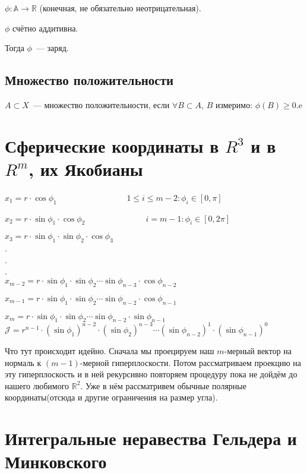 \documentclass[paper=a4, fontsize=17pt]{article}
\begin{document}
$\phi: \mathds{A} \to \mathds{R}$ (конечная, не обязательно неотрицательная).

$\phi$ счётно аддитивна.

Тогда $\phi$~--- заряд.

\subsection{Множество положительности}
$A \subset X$~--- множество положительности, если
$\forall B \subset A$, $B$ измеримо: $\phi(B) \geq 0$.e

\section{Сферические координаты в $ R^3 $ и в $ R^m $, их Якобианы}
$x_1 = r \cdot \cos \phi_1$
$\ \ \ \ \ \ \ \ \ \ \ \ \ \ \ \ \ \ \ \ \ \ \ \ \ \ \ \ \ \ \ \ \ \ \ $ 
$1 \leq i \leq m-2: \phi_i \in [0,\pi]$

$x_2 = r \cdot \sin \phi_1 \cdot \cos \phi_2$
$\ \ \ \ \ \ \ \ \ \ \ \ \ \ \ \ \ \ \ \ \ \ \ \ \ \ \ \ \ \ $
$i=m-1: \phi_i \in [0,2\pi]$

$x_3 = r \cdot \sin \phi_1 \cdot \sin \phi_2 \cdot \cos \phi_3$\\
.\\
.\\
.\\
$x_{m-2} = r \cdot \sin \phi_1 \cdot \sin \phi_2 \cdots \sin \phi_{n-3} \cdot \cos \phi_{n-2}$

$x_{m-1} = r \cdot \sin \phi_1 \cdot \sin \phi_2 \cdots \sin \phi_{n-2} \cdot \cos \phi_{n-1}$


$x_{m} = r \cdot \sin \phi_1 \cdot \sin \phi_2 \cdots \sin \phi_{n-2} \cdot \sin \phi_{n-1}$\\

$\mathcal{J} = r^{n-1} \cdot (\sin \phi_1)^{n-2} \cdot (\sin \phi_2)^{n-3} \cdots (\sin \phi_{n-2})^{1} \cdot (\sin \phi_{n-1})^{0}$

Что тут происходит идейно. Сначала мы проецируем наш $m$-мерный вектор на нормаль к $(m-1)$-мерной гиперплоскости. Потом рассматриваем проекцию на эту гиперплоскость и в ней рекурсивно повторяем процедуру пока не дойдём до нашего любимого $\mathbb{R}^2$. Уже в нём рассматривем обычные полярные координаты(отсюда и другие ограничения на размер угла).

\section{Интегральные неравества Гельдера и Минковского}
\end{document}

